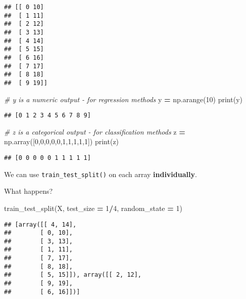 \documentclass[
]{book}
\newenvironment{Shaded}{\begin{snugshade}}{\end{snugshade}}
\newcommand{\BuiltInTok}[1]{#1}
\newcommand{\CommentTok}[1]{\textcolor[rgb]{0.56,0.35,0.01}{\textit{#1}}}
\newcommand{\DecValTok}[1]{\textcolor[rgb]{0.00,0.00,0.81}{#1}}
\newcommand{\NormalTok}[1]{#1}
\newcommand{\OperatorTok}[1]{\textcolor[rgb]{0.81,0.36,0.00}{\textbf{#1}}}
\begin{document}
\begin{verbatim}
## [[ 0 10]
##  [ 1 11]
##  [ 2 12]
##  [ 3 13]
##  [ 4 14]
##  [ 5 15]
##  [ 6 16]
##  [ 7 17]
##  [ 8 18]
##  [ 9 19]]
\end{verbatim}

\begin{Shaded}
\begin{Highlighting}[]
\CommentTok{\# y is a numeric output {-} for regression methods}
\NormalTok{y }\OperatorTok{=}\NormalTok{ np.arange(}\DecValTok{10}\NormalTok{)}
\BuiltInTok{print}\NormalTok{(y)}
\end{Highlighting}
\end{Shaded}

\begin{verbatim}
## [0 1 2 3 4 5 6 7 8 9]
\end{verbatim}

\begin{Shaded}
\begin{Highlighting}[]
\CommentTok{\# z is a categorical output {-} for classification methods}
\NormalTok{z }\OperatorTok{=}\NormalTok{ np.array([}\DecValTok{0}\NormalTok{,}\DecValTok{0}\NormalTok{,}\DecValTok{0}\NormalTok{,}\DecValTok{0}\NormalTok{,}\DecValTok{0}\NormalTok{,}\DecValTok{1}\NormalTok{,}\DecValTok{1}\NormalTok{,}\DecValTok{1}\NormalTok{,}\DecValTok{1}\NormalTok{,}\DecValTok{1}\NormalTok{])}
\BuiltInTok{print}\NormalTok{(z)}
\end{Highlighting}
\end{Shaded}

\begin{verbatim}
## [0 0 0 0 0 1 1 1 1 1]
\end{verbatim}

We can use \texttt{train\_test\_split()} on each array \textbf{individually}.

What happens?

\begin{Shaded}
\begin{Highlighting}[]
\NormalTok{train\_test\_split(X, test\_size }\OperatorTok{=} \DecValTok{1}\OperatorTok{/}\DecValTok{4}\NormalTok{, random\_state }\OperatorTok{=} \DecValTok{1}\NormalTok{)}
\end{Highlighting}
\end{Shaded}

\begin{verbatim}
## [array([[ 4, 14],
##        [ 0, 10],
##        [ 3, 13],
##        [ 1, 11],
##        [ 7, 17],
##        [ 8, 18],
##        [ 5, 15]]), array([[ 2, 12],
##        [ 9, 19],
##        [ 6, 16]])]
\end{verbatim}
\end{document}
